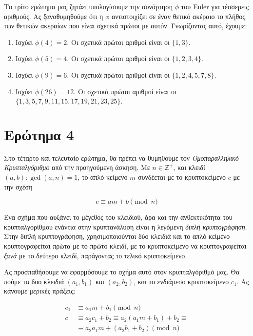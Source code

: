 \documentclass{article}
\begin{document}
Το τρίτο ερώτημα μας ζητάει υπολογίσουμε την συνάρτηση $\phi$ του Euler για τέσσερεις αριθμούς. Ας ξαναθυμηθούμε ότι η $\phi$ αντιστοιχίζει σε έναν θετικό ακέραιο το πλήθος των θετικών ακεραίων που είναι σχετικά πρώτοι με αυτόν. Γνωρίζοντας αυτό, έχουμε:

\begin{enumerate}
    \item Ισχύει $\phi(4) = 2$. Οι σχετικά πρώτοι αριθμοί είναι οι $\{1, 3\}$.
    \item Ισχύει $\phi(5) = 4$. Οι σχετικά πρώτοι αριθμοί είναι οι $\{1, 2, 3, 4\}$.
    \item Ισχύει $\phi(9) = 6$. Οι σχετικά πρώτοι αριθμοί είναι οι $\{1, 2, 4, 5, 7, 8\}$.
    \item Ισχύει $\phi(26) = 12$. Οι σχετικά πρώτοι αριθμοί είναι οι $\{1, 3, 5, 7, 9, 11, 15, 17, 19, 21, 23, 25\}$.
\end{enumerate}

\section*{Ερώτημα 4}

Στο τέταρτο και τελευταίο ερώτημα, θα πρέπει να θυμηθούμε τον \emph{Ομοπαραλληλικό Κρυπταλγόριθμο} από την προηγούμενη άσκηση. Με $n \in \mathbb{Z}^+$, και κλειδί $(a, b) : \gcd(a, n) = 1$, το απλό κείμενο $m$ συνδέεται με το κρυπτοκείμενο $c$ με την σχέση

$$c \equiv am + b \pmod n$$

Ένα σχήμα που αυξάνει το μέγεθος του κλειδιού, άρα και την ανθεκτικότητα του κρυπταλγορίθμου ενάντια στην κρυπτανάλυση είναι η λεγόμενη \emph{διπλή κρυπτογράφηση}. Στην διπλή κρυπτογράφηση, χρησιμοποιούνται δύο κλειδιά και το απλό κείμενο κρυπτογραφείται πρώτα με το πρώτο κλειδί, με το κρυπτοκείμενο να κρυπτογραφείται \emph{ξανά} με το δεύτερο κλειδί, παράγοντας το τελικό κρυπτοκείμενο.

Ας προσπαθήσουμε να εφαρμόσουμε το σχήμα αυτό στον κρυπταλγόριθμό μας. Θα πούμε τα δυο κλειδιά $(a_1, b_1)$ και $(a_2, b_2)$, και το ενδιάμεσο κρυπτοκείμενο $c_1$. Ας κάνουμε μερικές πράξεις:

\begin{align*}
    c_1 &\equiv a_1m + b_1 \pmod n \\
    c &\equiv a_2c_1 + b_2 \equiv a_2(a_1m + b_1) + b_2 \equiv \\
    &\equiv a_2a_1m + (a_2b_1 + b_2) \pmod n
\end{align*}
\end{document}
